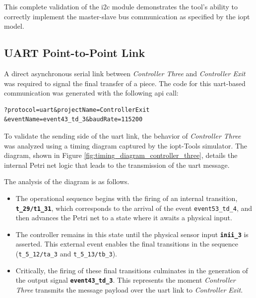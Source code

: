 This complete validation of the \gls{i2c} module demonstrates the tool's ability to correctly implement the master-slave bus communication as specified by the \gls{iopt} model.



\subsection{UART Point-to-Point Link}
\label{subsec:uart_implementation}

A direct asynchronous serial link between \textit{Controller Three} and \textit{Controller Exit} was required to signal the final transfer of a piece. The code for this \gls{uart}-based communication was generated with the following \gls{api} call:

\begin{verbatim}
?protocol=uart&projectName=ControllerExit
&eventName=event43_td_3&baudRate=115200
\end{verbatim}

To validate the sending side of the \gls{uart} link, the behavior of \textit{Controller Three} was analyzed using a timing diagram captured by the \gls{iopt}-Tools simulator. The diagram, shown in Figure \ref{fig:timing_diagram_controller_three}, details the internal Petri net logic that leads to the transmission of the \gls{uart} message.

The analysis of the diagram is as follows.
\begin{itemize}
    \item The operational sequence begins with the firing of an internal transition, \textbf{\texttt{t\_29/t1\_31}}, which corresponds to the arrival of the event \texttt{event53\_td\_4}, and then advances the Petri net to a state where it awaits a physical input.
    
    \item The controller remains in this state until the physical sensor input \textbf{\texttt{inii\_3}} is asserted. This external event enables the final transitions in the sequence (\texttt{t\_5\_12/ta\_3} and \texttt{t\_5\_13/tb\_3}).
    
    \item Critically, the firing of these final transitions culminates in the generation of the output signal \textbf{\texttt{event43\_td\_3}}. This represents the moment \textit{Controller Three} transmits the message payload over the \gls{uart} link to \textit{Controller Exit}.
\end{itemize}

